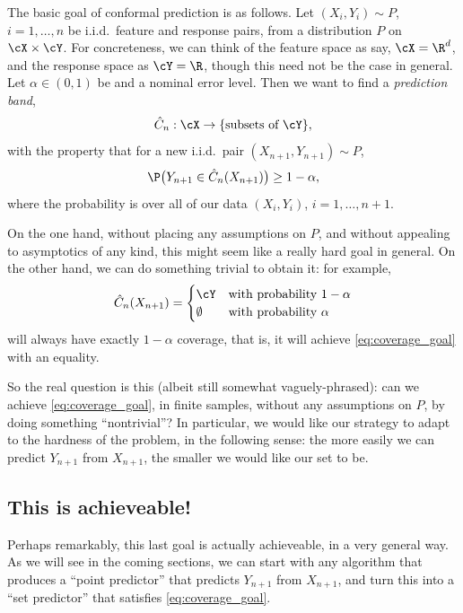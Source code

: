 \documentclass{article}
\begin{document}
The basic goal of conformal prediction is as follows. Let $(X_i,Y_i) \sim P$,
$i=1,\dots,n$ be i.i.d.\ feature and response pairs, from a distribution 
$P$ on $\cX \times \cY$. For concreteness, we can think of the feature space as
say, $\cX = \R^d$, and the response space as $\cY = \R$, though this need not be 
the case in general. Let $\alpha \in (0,1)$ be and a nominal error level. Then
we want to find a \emph{prediction band}, 
\[
\hC_n : \cX \to \{ \text{subsets of $\cY$} \},
\]
with the property that for a new i.i.d.\ pair $(X_{n+1},Y_{n+1}) \sim P$,
\begin{equation}
\label{eq:coverage_goal}
\P\big( Y_{n+1} \in \hC_n(X_{n+1}) \big) \geq 1-\alpha,
\end{equation}
where the probability is over all of our data $(X_i,Y_i)$, $i=1,\dots,n+1$. 

On the one hand, without placing any assumptions on $P$, and without appealing
to asymptotics of any kind, this might seem like a really hard goal in
general. On the other hand, we can do something trivial to obtain it: for example,   
\[
\hC_n(X_{n+1}) = 
\begin{cases}
\cY & \text{with probability $1-\alpha$} \\
\emptyset & \text{with probability $\alpha$}
\end{cases}
\]
will always have exactly $1-\alpha$ coverage, that is, it will achieve
\eqref{eq:coverage_goal} with an equality.   

So the real question is this (albeit still somewhat vaguely-phrased): can we
achieve \eqref{eq:coverage_goal}, in finite samples, without any assumptions on
$P$, by doing something ``nontrivial''? In particular, we would like our
strategy to adapt to the hardness of the problem, in the following sense: the
more easily we can predict $Y_{n+1}$ from $X_{n+1}$, the smaller we would like
our set  to be. 

\subsection{This is achieveable!}
\label{sec:no_features}

Perhaps remarkably, this last goal is actually achieveable, in a very general
way. As we will see in the coming sections, we can start with any algorithm that
produces a ``point predictor''  that predicts $Y_{n+1}$ from
$X_{n+1}$, and turn this into a ``set predictor''  that satisfies
\eqref{eq:coverage_goal}. 
\end{document}
